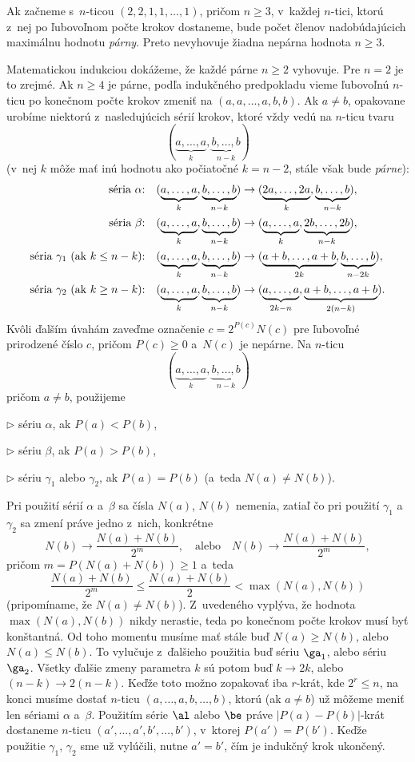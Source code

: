{%
Ak začneme s~$n$-ticou $(2,2,1,1,\dots,1)$, pričom $n\ge3$, v~každej $n$-tici, ktorú z~nej po ľubovoľnom počte krokov dostaneme, bude počet členov nadobúdajúcich maximálnu hodnotu {\it párny}. Preto nevyhovuje žiadna nepárna hodnota $n\ge3$.

Matematickou indukciou dokážeme, že každé párne $n\ge2$ vyhovuje. Pre $n=2$ je to zrejmé. Ak $n\ge4$ je párne, podľa indukčného predpokladu vieme ľubovoľnú $n$-ticu po konečnom počte krokov zmeniť na $(a,a,\dots,a,b,b)$. Ak $a\ne b$, opakovane urobíme niektorú z~nasledujúcich sérií krokov, ktoré vždy vedú na $n$-ticu tvaru
$$
(\underbrace{a,\dots,a}_{k},\underbrace{b,\dots,b}_{n-k})
$$
(v~nej $k$ môže mať inú hodnotu ako počiatočné $k=n-2$, stále však bude {\it párne\/}):
$$
\aligned
\text{séria $\alpha$:}&\quad
(\underbrace{a,\dots,a}_{k},\underbrace{b,\dots,b}_{n-k})\to
(\underbrace{2a,\dots,2a}_{k},\underbrace{b,\dots,b}_{n-k}),\\
\text{séria $\beta$:}&\quad
(\underbrace{a,\dots,a}_{k},\underbrace{b,\dots,b}_{n-k})\to
(\underbrace{a,\dots,a}_{k},\underbrace{2b,\dots,2b}_{n-k}),\\
\text{séria $\gamma_1$ (ak $k\le n-k$):}&\quad
(\underbrace{a,\dots,a}_{k},\underbrace{b,\dots,b}_{n-k})\to
(\underbrace{a+b,\dots,a+b}_{2k},\underbrace{b,\dots,b}_{n-2k}),\\
\text{séria $\gamma_2$ (ak $k\ge n-k$):}&\quad
(\underbrace{a,\dots,a}_{k},\underbrace{b,\dots,b}_{n-k})\to
(\underbrace{a,\dots,a}_{2k-n},\underbrace{a+b,\dots,a+b}_{2(n-k)}).
\endaligned
$$
Kvôli ďalším úvahám zaveďme označenie $c=2^{P(c)}N(c)$ pre ľubovoľné prirodzené číslo $c$, pričom $P(c)\ge0$
a~$N(c)$ je nepárne. Na $n$-ticu
$$
(\underbrace{a,\dots,a}_{k},\underbrace{b,\dots,b}_{n-k})
$$
pričom $a\ne b$, použijeme
\item{$\triangleright$} sériu $\alpha$, ak $P(a)<P(b)$,
\item{$\triangleright$} sériu $\beta$, ak $P(a)>P(b)$,
\item{$\triangleright$}  sériu $\gamma_1$ alebo $\gamma_2$, ak $P(a)=P(b)$ (a~teda $N(a)\ne N(b)$).


Pri použití sérií $\alpha$ a~$\beta$ sa čísla $N(a)$, $N(b)$ nemenia, zatiaľ čo pri použití $\gamma_1$ a~$\gamma_2$ sa zmení práve jedno z~nich, konkrétne
$$
N(b)\to\frac{N(a)+N(b)}{2^m},\quad \text{alebo}\quad
N(b)\to\frac{N(a)+N(b)}{2^m},
$$
pričom $m=P(N(a)+N(b))\ge1$ a~teda
$$
\frac{N(a)+N(b)}{2^m}\le\frac{N(a)+N(b)}{2}<\max(N(a),N(b))
$$
(pripomíname, že $N(a)\ne N(b)$). Z~uvedeného vyplýva, že hodnota $\max(N(a),N(b))$ nikdy nerastie, teda po konečnom počte krokov musí byť konštantná. Od toho momentu musíme mať stále buď $N(a)\ge N(b)$, alebo $N(a)\le N(b)$. To vylučuje z~ďalšieho použitia buď sériu $\ga_1$, alebo sériu $\ga_2$. Všetky ďalšie zmeny parametra $k$ sú potom buď  $k\to2k$, alebo $(n-k)\to2(n-k)$. Keďže toto možno zopakovať iba $r$-krát, kde $2^r\le n$, na konci musíme dostať $n$-ticu $(a,\dots,a,b,\dots,b)$, ktorú (ak $a\ne b$) už môžeme meniť len sériami $\alpha$ a~$\beta$. Použitím série $\al$ alebo $\be$ práve $|P(a)-P(b)|$-krát dostaneme $n$-ticu $(a',\dots,a',b',\dots,b')$, v~ktorej $P(a')=P(b')$. Keďže použitie $\gamma_1$, $\gamma_2$ sme už vylúčili, nutne $a'=b'$, čím je indukčný krok ukončený.

}

